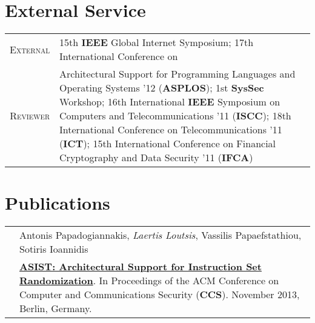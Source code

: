 \documentclass[a4paper,10pt]{article} %
\begin{document}

\section{External Service}

\begin{tabular}{rp{12cm}}

\textsc{External} & 15th \textbf{IEEE} Global Internet Symposium; 17th International Conference on \\
\textsc{Reviewer} & Architectural Support for Programming Languages and Operating Systems '12 (\textbf{ASPLOS}); 1st \textbf{SysSec} Workshop; 16th International \textbf{IEEE} Symposium on Computers and Telecommunications '11 (\textbf{ISCC}); 18th International Conference on Telecommunications '11 (\textbf{ICT}); 15th International Conference on Financial Cryptography and Data Security '11 (\textbf{IFCA}) 

\end{tabular}


\section{Publications}

\begin{tabular}{rp{13cm}}

& Antonis Papadogiannakis, \emph{Laertis Loutsis}, Vassilis Papaefstathiou, Sotiris Ioannidis \\
& \href{https://dl.acm.org/citation.cfm?id=2508859.2516670}{\textbf{ASIST: Architectural Support for Instruction Set Randomization}}. In Proceedings of the ACM Conference on Computer and Communications Security (\textbf{CCS}). \small November 2013,  Berlin, Germany. \\

\end{tabular}

\end{document}
